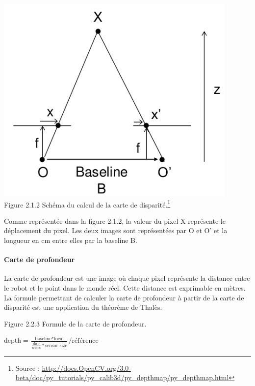 \documentclass[12pt,a4paper]{report}
\begin{document}
\begin{center}
	\includegraphics[scale=0.5]{disparity.jpg}\\
	Figure 2.1.2 Schéma du calcul de la carte de disparité.\footnote{Source : \url{http://docs.OpenCV.org/3.0-beta/doc/py_tutorials/py_calib3d/py_depthmap/py_depthmap.html}}\\
\end{center}

Comme représentée dans la figure 2.1.2, la valeur du pixel X représente le déplacement du pixel.
Les deux images sont représentées par O et O' et la longueur en cm entre elles par la baseline B.
\paragraph{Carte de profondeur}
La carte de profondeur est une image où chaque pixel représente la distance entre le robot et le point dans le monde réel. Cette distance est exprimable en mètres.\\
La formule permettant de calculer la carte de profondeur à partir de la carte de disparité est une application du théorème de Thalès.\\

\begin{center}
Figure 2.2.3 Formule de la carte de profondeur.\\

\begin{huge}
$\text{depth} = \frac{\text{baseline} * \text{focal}}{\frac{\text{disp}}{\text{width}} * \text{sensor size}} / \text{référence}$\\
\end{huge}
\end{center}
\end{document}
